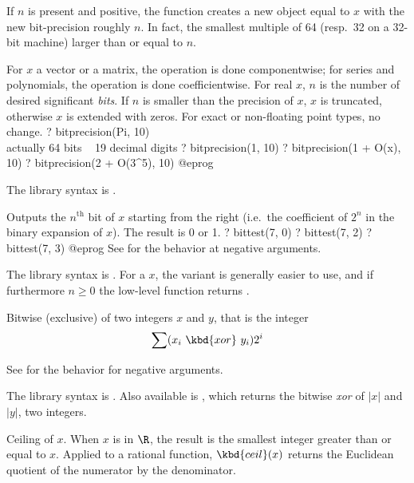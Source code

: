 If $n$ is present and positive, the function creates a new object equal to $x$
with the new bit-precision roughly $n$. In fact, the smallest multiple of 64
(resp.~32 on a 32-bit machine) larger than or equal to $n$.

For $x$ a vector or a matrix, the operation is
done componentwise; for series and polynomials, the operation is done
coefficientwise. For real $x$, $n$ is the number of desired significant
\emph{bits}. If $n$ is smaller than the precision of $x$, $x$ is truncated,
otherwise $x$ is extended with zeros. For exact or non-floating point types,
no change.
\bprog
? bitprecision(Pi, 10)    \\ actually 64 bits ~ 19 decimal digits
? bitprecision(1, 10)
? bitprecision(1 + O(x), 10)
? bitprecision(2 + O(3^5), 10)
@eprog\noindent

The library syntax is .

\label{se:bittest}
Outputs the $n^{\text{th}}$ bit of $x$ starting
from the right (i.e.~the coefficient of $2^n$ in the binary expansion of $x$).
The result is 0 or 1.
\bprog
? bittest(7, 0)
? bittest(7, 2)
? bittest(7, 3)
@eprog\noindent
See  for the behavior at negative arguments.

The library syntax is .
For a  $x$, the variant  is
generally easier to use, and if furthermore $n\ge 0$ the low-level function
 returns .

\label{se:bitxor}
Bitwise (exclusive) 
of two integers $x$ and $y$, that is the integer
$$\sum (x_i~\kbd{xor}~y_i) 2^i$$

See  for the behavior for negative arguments.

The library syntax is .
Also available is
, which returns the bitwise \emph{xor}
of $|x|$ and $|y|$, two integers.

\label{se:ceil}
Ceiling of $x$. When $x$ is in $\R$, the result is the
smallest integer greater than or equal to $x$. Applied to a rational
function, $\kbd{ceil}(x)$ returns the Euclidean quotient of the numerator by
the denominator.

